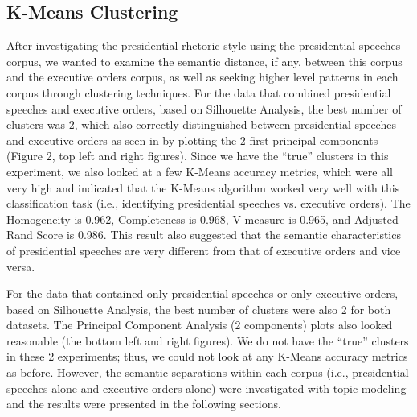 \documentclass{article}
\begin{document}
{{\subsection{K-Means Clustering}{After investigating the presidential rhetoric style using the presidential speeches corpus, we wanted to examine the semantic distance, if any, between this corpus and the executive orders corpus, as well as seeking higher level patterns in each corpus through clustering techniques. For the data that combined presidential speeches and executive orders, based on Silhouette Analysis, the best number of clusters was 2, which also correctly distinguished between presidential speeches and executive orders as seen in by plotting the 2-first principal components (Figure 2,  top left and right figures). Since we have the “true” clusters in this experiment, we also looked at a few K-Means accuracy metrics, which were all very high and indicated that the K-Means algorithm worked very well with this classification task (i.e., identifying presidential speeches vs. executive orders). The Homogeneity is 0.962, Completeness is 0.968, V-measure is 0.965, and Adjusted Rand Score is 0.986. This result also suggested that the semantic characteristics of presidential speeches are very different from that of executive orders and vice versa.

For the data that contained only presidential speeches or only executive orders, based on Silhouette Analysis, the best number of clusters were also 2 for both datasets. The Principal Component Analysis (2 components) plots also looked reasonable (the bottom left and right figures). We do not have the “true” clusters in these 2 experiments; thus, we could not look at any K-Means accuracy metrics as before. However, the semantic separations within each corpus (i.e., presidential speeches alone and executive orders alone) were investigated with topic modeling and the results were presented in the following sections.
	
}}}
\end{document}

